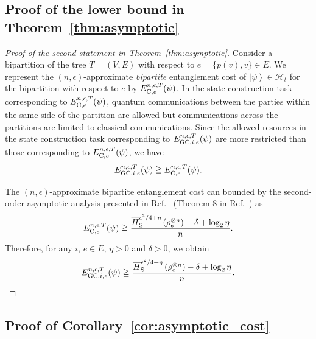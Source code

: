 \documentclass[preprintnumbers,aps,amsmath,amssymb,pra,twocolumn,showpacs,superscriptaddress,floatfix]{revtex4-1}
\def\Ket#1{\left|#1\right\rangle}
\theoremstyle{plain}
\theoremstyle{definition}
\theoremstyle{remark}
\begin{document}
\subsection{Proof of the lower bound in Theorem~\ref{thm:asymptotic}}

\begin{proof}[Proof of the second statement in Theorem~\ref{thm:asymptotic}]
Consider a bipartition of the tree $T=(V,E)$ with respect to $e=\{p(v),v\} \in E$.  We represent the $(n,\epsilon)$-approximate \textit{bipartite} entanglement cost of $\Ket\psi\in\mathcal{H}_t$ for the bipartition with respect to $e$ by $E_{\textup{C},e}^{n,\epsilon,T}{\left(\psi\right)}$.  In the state construction task corresponding to $E_{\textup{C}, e}^{n,\epsilon,T}{\left(\psi\right)}$, quantum communications between the parties within the same side of the partition are allowed but communications across the partitions are limited to classical communications. Since the allowed resources in the state construction task corresponding to $E_{\textup{GC},i,e}^{n,\epsilon,T}{\left(\psi\right)}$ are more restricted than those corresponding to $E_{\textup{C},e}^{n,\epsilon,T}{\left(\psi\right)}$, we have
\begin{equation*}
    E_{\textup{GC},i,e}^{n,\epsilon,T}{\left(\psi\right)}\geqq E_{\textup{C},e}^{n,\epsilon,T}{\left(\psi\right)}.
\end{equation*}

The  $(n,\epsilon)$-approximate bipartite entanglement cost can bounded by the second-order asymptotic analysis presented in Ref.~\cite{RefWorks:160} (Theorem 8 in Ref.~\cite{RefWorks:160}) as
\begin{equation*}
E_{\textup{C},e}^{n,\epsilon,T}{\left(\psi\right)} \geqq \frac{\overline{H}_{\textup{S}}^{\epsilon^2/4+\eta}\left(\rho_e^{\otimes n}\right)-\delta+\log_2 \eta}{n}.
\end{equation*}
Therefore, for any $i$, $e\in E$, $\eta>0$ and $\delta>0$, we obtain
\[
    E_{\textup{GC},i,e}^{n,\epsilon,T}{\left(\psi\right)}\geqq \frac{\overline{H}_{\textup{S}}^{\epsilon^2/4+\eta}\left(\rho_e^{\otimes n}\right)-\delta+\log_2 \eta}{n}.
\]
\end{proof}

\subsection{Proof of Corollary~\ref{cor:asymptotic_cost}}
\end{document}
